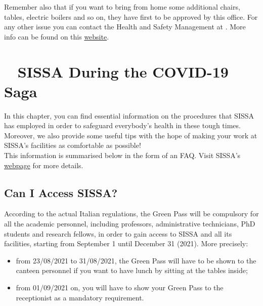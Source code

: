 \documentclass{sissavademecum}
\begin{document}
Remember also that if you want to bring from home some additional chairs, tables, electric boilers and so on, they have first to be approved by this office. For any other issue you can contact the Health and Safety Management at . More info can be found on this \href{http://www.sissa.it/safety}{website}.



\chapter{\texorpdfstring{\faShieldVirus\ }{} SISSA During the COVID-19 Saga}

In this chapter, you can find essential information on the procedures that SISSA has employed in order to safeguard everybody's health in these tough times. Moreover, we also provide some useful tips with the hope of making your work at SISSA's facilities as comfortable as possible! \\
This information is summarised below in the form of an FAQ. Visit SISSA's \href{https://www.sissa.it/news/covid-19-access-sissa-and-schools-activities}{webpage} for more details.


\section{Can I Access SISSA?}

According to the actual Italian regulations, the Green Pass will be compulsory for all the academic personnel, including professors, administrative technicians, PhD students and research fellows, in order to gain access to SISSA and all its facilities, starting from September 1 until December 31 (2021). More precisely:
\begin{itemize}
    \item from 23/08/2021 to 31/08/2021, the Green Pass will have to be shown to the canteen personnel if you want to have lunch by sitting at the tables inside;
    \item from 01/09/2021 on, you will have to show your Green Pass to the receptionist as a mandatory requirement.
\end{itemize}
\end{document}
